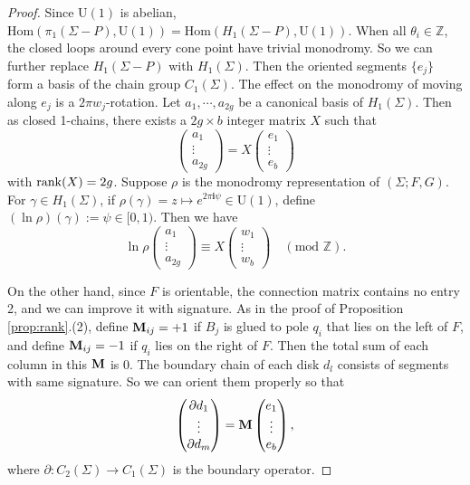 \documentclass[pdflatex,sn-mathphys]{sn-jnl}%
\numberwithin{equation}{section}
\theoremstyle{thmstyleone}%
\newcommand{\ZZ}{\mathbb{Z}}
\newcommand{\ii}{\mathbf{i}}
\newcommand{\pt}{\partial}
\newcommand{\Uone}{\mathrm{U}(1)}
\begin{document}
\begin{proof}
    Since $\Uone$ is abelian, $\mathrm{Hom}(\pi_1(\Sigma-P), \Uone) = \mathrm{Hom}(H_1(\Sigma-P), \Uone)$. When all $\theta_i\in\ZZ$, the closed loops around every cone point have trivial monodromy. So we can further replace $H_1(\Sigma-P)$ with $H_1(\Sigma)$. Then the oriented segments $\{e_j\}$ form a basis of the chain group $C_1(\Sigma)$. The effect on the monodromy of moving along $e_j$ is a $2\pi w_j$-rotation.
    Let $a_1, \cdots , a_{2g} $ be a canonical basis of $H_1(\Sigma)$. Then as closed 1-chains, there exists a $2g\times b$ integer matrix $X$ such that
    \[\begin{pmatrix} a_1  \\ \vdots \\ a_{2g}  \end{pmatrix} =
    X \begin{pmatrix} e_1  \\ \vdots  \\ e_b \end{pmatrix} \]
    with $\mathrm{rank}(X)=2g$. Suppose $\rho$ is the monodromy representation of $(\Sigma;F,G)$. For $\gamma\in H_1(\Sigma)$, if $\rho(\gamma)=z \mapsto e^{2\pi\ii \psi} \in \Uone$, define $(\ln\rho)(\gamma):=\psi\in[0,1)$. Then we have
    \[\ln\rho \begin{pmatrix} a_1  \\ \vdots \\ a_{2g}  \end{pmatrix} \equiv
    X \begin{pmatrix} w_1  \\ \vdots  \\ w_b \end{pmatrix} \quad (\text{mod } \ZZ). \]

    On the other hand, since $F$ is orientable, the connection matrix contains no entry 2, and we can improve it with signature. As in the proof of Proposition \ref{prop:rank}.(2), define $\mathbf{M}_{ij}=+1$ if $B_j$ is glued to pole $q_i$ that lies on the left of $F$, and define $\mathbf{M}_{ij}=-1$ if $q_i$ lies on the right of $F$. Then the total sum of each column in this $\mathbf{M}$ is 0.
    The boundary chain of each disk $d_l$ consists of segments with same signature. So we can orient them properly so that
    \[\begin{pmatrix} \pt d_1  \\ \vdots \\ \pt d_m  \end{pmatrix} =
    \mtxM \begin{pmatrix} e_1  \\ \vdots  \\ e_b \end{pmatrix}, \]
    where $\pt:C_2(\Sigma) \to C_1(\Sigma)$ is the boundary operator.


\end{proof}
\end{document}

